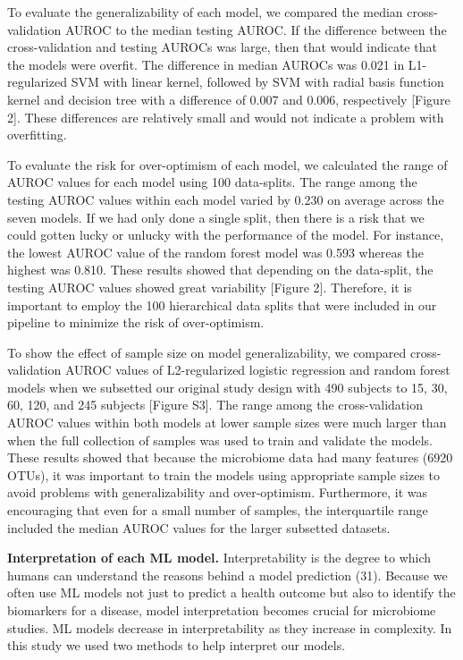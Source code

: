 \documentclass[11pt,]{article}
\begin{document}
To evaluate the generalizability of each model, we compared the median
cross-validation AUROC to the median testing AUROC. If the difference
between the cross-validation and testing AUROCs was large, then that
would indicate that the models were overfit. The difference in median
AUROCs was 0.021 in L1-regularized SVM with linear kernel, followed by
SVM with radial basis function kernel and decision tree with a
difference of 0.007 and 0.006, respectively {[}Figure 2{]}. These
differences are relatively small and would not indicate a problem with
overfitting.

To evaluate the risk for over-optimism of each model, we calculated the
range of AUROC values for each model using 100 data-splits. The range
among the testing AUROC values within each model varied by 0.230 on
average across the seven models. If we had only done a single split,
then there is a risk that we could gotten lucky or unlucky with the
performance of the model. For instance, the lowest AUROC value of the
random forest model was 0.593 whereas the highest was 0.810. These
results showed that depending on the data-split, the testing AUROC
values showed great variability {[}Figure 2{]}. Therefore, it is
important to employ the 100 hierarchical data splits that were included
in our pipeline to minimize the risk of over-optimism.

To show the effect of sample size on model generalizability, we compared
cross-validation AUROC values of L2-regularized logistic regression and
random forest models when we subsetted our original study design with
490 subjects to 15, 30, 60, 120, and 245 subjects {[}Figure S3{]}. The
range among the cross-validation AUROC values within both models at
lower sample sizes were much larger than when the full collection of
samples was used to train and validate the models. These results showed
that because the microbiome data had many features (6920 OTUs), it was
important to train the models using appropriate sample sizes to avoid
problems with generalizability and over-optimism. Furthermore, it was
encouraging that even for a small number of samples, the interquartile
range included the median AUROC values for the larger subsetted
datasets.

\textbf{Interpretation of each ML model.} Interpretability is the degree
to which humans can understand the reasons behind a model prediction
(31). Because we often use ML models not just to predict a health
outcome but also to identify the biomarkers for a disease, model
interpretation becomes crucial for microbiome studies. ML models
decrease in interpretability as they increase in complexity. In this
study we used two methods to help interpret our models.
\end{document}
